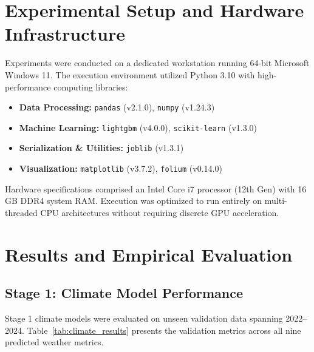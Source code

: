 \documentclass[journal,onecolumn,11pt]{IEEEtran}
\begin{document}
\section{Experimental Setup and Hardware Infrastructure}

Experiments were conducted on a dedicated workstation running 64-bit Microsoft Windows 11. The execution environment utilized Python 3.10 with high-performance computing libraries:
\begin{itemize}
    \item \textbf{Data Processing:} \texttt{pandas} (v2.1.0), \texttt{numpy} (v1.24.3)
    \item \textbf{Machine Learning:} \texttt{lightgbm} (v4.0.0), \texttt{scikit-learn} (v1.3.0)
    \item \textbf{Serialization \& Utilities:} \texttt{joblib} (v1.3.1)
    \item \textbf{Visualization:} \texttt{matplotlib} (v3.7.2), \texttt{folium} (v0.14.0)
\end{itemize}

Hardware specifications comprised an Intel Core i7 processor (12th Gen) with 16 GB DDR4 system RAM. Execution was optimized to run entirely on multi-threaded CPU architectures without requiring discrete GPU acceleration.

\section{Results and Empirical Evaluation}

\subsection{Stage 1: Climate Model Performance}
Stage 1 climate models were evaluated on unseen validation data spanning 2022--2024. Table~\ref{tab:climate_results} presents the validation metrics across all nine predicted weather metrics.
\end{document}
